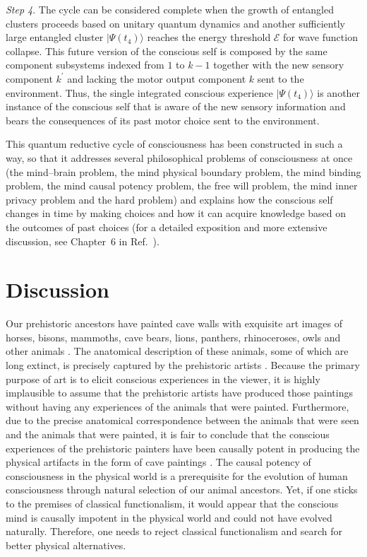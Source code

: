 \documentclass{ws-ijmpb}
\begin{document}
\begin{example}
\emph{Step 4}. The cycle can be considered complete when the growth
of entangled clusters proceeds based on unitary quantum dynamics
and another sufficiently large entangled cluster $|\Psi(t_{4})\rangle$
reaches the energy threshold $\mathscr{E}$ for wave function collapse.
This future version of the conscious self is composed by the same
component subsystems indexed from $1$ to $k-1$ together with the
new sensory component $k^{\prime}$ and lacking the motor output component
$k$ sent to the environment. Thus, the single integrated conscious
experience $|\Psi(t_{4})\rangle$ is another instance of the conscious
self that is aware of the new sensory information and bears the consequences
of its past motor choice sent to the environment. 

This quantum reductive cycle of consciousness has been constructed
in such a way, so that it addresses several philosophical problems of
consciousness at once (the mind--brain problem, the mind physical
boundary problem, the mind binding problem, the mind causal potency
problem, the free will problem, the mind inner privacy problem and
the hard problem) and explains how the conscious self changes in time
by making choices and how it can acquire knowledge based on the outcomes
of past choices (for a detailed exposition and more extensive discussion,
see Chapter~6 in Ref.~).
\end{example}

\section{Discussion}
\label{sec:9}

Our prehistoric ancestors have painted cave walls with exquisite art
images of horses, bisons, mammoths, cave bears, lions, panthers, rhinoceroses,
owls and other animals \cite{Chauvet1996,Chauvet2001,Aubert2014,Hoffmann2018,Pike2012,Herzog2010,Harris2011}. The anatomical
description of these animals, some of which are long extinct, is precisely
captured by the prehistoric artists \cite{Kurten1972,Bon2011}. Because
the primary purpose of art is to elicit conscious experiences in the
viewer, it is highly implausible to assume that the prehistoric artists
have produced those paintings without having any experiences of the
animals that were painted. Furthermore, due to the precise anatomical
correspondence between the animals that were seen and the animals that were
painted, it is fair to conclude that the conscious experiences of
the prehistoric painters have been causally potent in producing
the physical artifacts in the form of cave paintings \cite{Lewis2002,Lewis2003}.
The causal potency of consciousness in the physical world is a prerequisite
for the evolution of human consciousness through natural selection
of our animal ancestors. Yet, if one sticks to the premises of classical
functionalism, it would appear that the conscious mind is causally
impotent in the physical world and could not have evolved naturally.
Therefore, one needs to reject classical functionalism and search for better physical alternatives.
\end{document}
